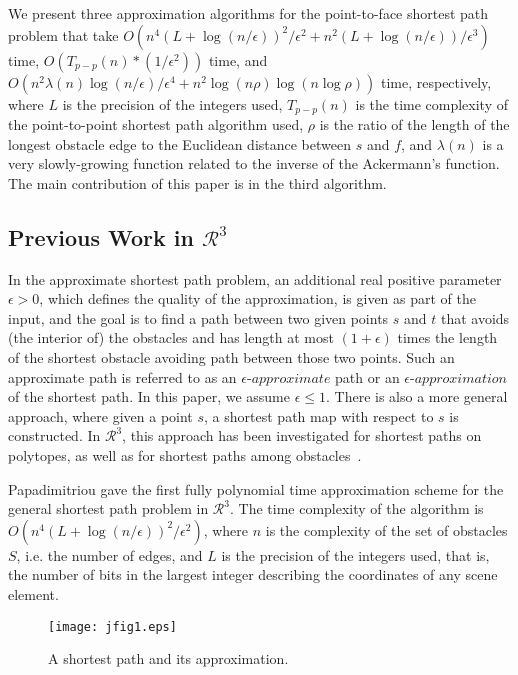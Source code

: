 \documentclass{llncs}
\begin{document}
We present three approximation algorithms for the point-to-face shortest path problem that take
$O(n^4(L+\log(n/\epsilon))^2/\epsilon^2+n^2(L+\log(n/\epsilon))/\epsilon^3)$ time,
$O(T_{p-p}(n)*(1/\epsilon^2))$ time, and
$O(n^2\lambda(n)\log(n/\epsilon)/{\epsilon}^4+n^2\log(n\rho)\log(n\log\rho))$ time,
respectively, where $L$ is the precision of the integers used, $T_{p-p}(n)$ is the time
complexity of the point-to-point shortest path algorithm used, $\rho$ is the ratio of the length
of the longest obstacle edge to the
Euclidean distance between $s$ and $f$, and $\lambda(n)$ is a very slowly-growing function related to
the inverse of the Ackermann's function. The main contribution of this paper is in the third algorithm.



\subsection{Previous Work in $\mathcal{R}^3$}
\label{prev}


In the approximate shortest path problem, an additional real positive parameter $\epsilon > 0$, which defines the quality of the approximation, is given as part of
the input, and the goal is to find a path between two given points $s$ and $t$
that avoids (the interior of)
the obstacles and has length at most $(1+\epsilon)$ times the length of the shortest obstacle avoiding
path between those two points. Such an approximate path is referred to as an $\epsilon$-$approximate$
path or an $\epsilon$-$approximation$ of the shortest path. In this paper, we assume
$\epsilon \le 1$.
There is also a more general approach, where given a point $s$, a shortest path map with respect to $s$
is constructed. In $\mathcal{R}^3$, this approach has been investigated for shortest paths on polytopes,
as well as for shortest paths among obstacles~\cite{Sar99}.

Papadimitriou \cite{Pap85} gave the first fully polynomial time approximation scheme for the general shortest
path problem in $\mathcal{R}^3$.
The time complexity of the algorithm is $O(n^4(L+\log(n/\epsilon))^2/\epsilon^2)$,
where $n$ is the complexity of the set of obstacles $S$, i.e. the number of edges, and $L$ is the precision of the
integers used, that is, the number of bits in the largest integer describing the coordinates of
any scene element.

\begin{figure}\begin{center}
    \leavevmode
\texttt{[image: jfig1.eps]}
    \caption{A shortest path and its approximation.}
    \label{jfig1}
    \end{center}
    \vspace{-0.15in}
\end{figure}
\end{document}

